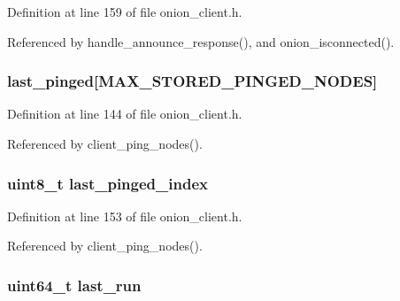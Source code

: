 Definition at line 159 of file onion\+\_\+client.\+h.



Referenced by handle\+\_\+announce\+\_\+response(), and onion\+\_\+isconnected().

\hypertarget{struct_onion___client_a27015cced65360814a59652b662ef143}{
\subsubsection[{last\+\_\+pinged}]{ last\+\_\+pinged\mbox{[}{\bf M\+A\+X\+\_\+\+S\+T\+O\+R\+E\+D\+\_\+\+P\+I\+N\+G\+E\+D\+\_\+\+N\+O\+D\+E\+S}\mbox{]}}}\label{struct_onion___client_a27015cced65360814a59652b662ef143}


Definition at line 144 of file onion\+\_\+client.\+h.



Referenced by client\+\_\+ping\+\_\+nodes().

\hypertarget{struct_onion___client_a6e0a5214a3dffa151dd52dc4c230145b}{
\subsubsection[{last\+\_\+pinged\+\_\+index}]{\setlength{\rightskip}{0pt plus 5cm}uint8\+\_\+t last\+\_\+pinged\+\_\+index}}\label{struct_onion___client_a6e0a5214a3dffa151dd52dc4c230145b}


Definition at line 153 of file onion\+\_\+client.\+h.



Referenced by client\+\_\+ping\+\_\+nodes().

\hypertarget{struct_onion___client_a73e8197b772061572cb931a378ade3e4}{
\subsubsection[{last\+\_\+run}]{\setlength{\rightskip}{0pt plus 5cm}uint64\+\_\+t last\+\_\+run}}\label{struct_onion___client_a73e8197b772061572cb931a378ade3e4}


